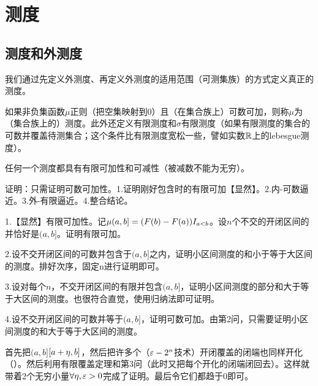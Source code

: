 \chapter{测度}

\section{测度和外测度}

我们通过先定义外测度、再定义外测度的适用范围（可测集族）的方式定义真正的测度。

如果非负集函数$\mu$正则（把空集映射到0）且（在集合族上）可数可加，则称$\mu$为（集合族上的）测度。此外还定义有限测度和$\sigma$有限测度（如果有限测度的集合的可数并覆盖待测集合；这个条件比有限测度宽松一些，譬如实数$\mbox{$\mathbb R$}$上的lebesgue测度）。

任何一个测度都具有有限可加性和可减性（被减数不能为无穷）。






证明：只需证明可数可加性。1.证明刚好包含时的有限可加【显然】。2.内-可数逼近。3.外-有限逼近。4.整合结论。

1.【显然】有限可加性。记$\mbox{$\mu$}(a,b]=(F(b)-F(a))I_{a<b}$。设$n$个不交的开闭区间的并恰好是$(a,b]$。证明有限可加。

2.设不交开闭区间的可数并包含于$(a,b]$之内，证明小区间测度的和小于等于大区间的测度。排好次序，固定n进行证明即可。

3.设对每个$n$，不交开闭区间的有限并包含$(a,b]$，证明小区间测度的部分和大于等于大区间的测度。也很符合直觉，使用归纳法即可证明。

4.设不交开闭区间的可数并等于$(a,b]$，证明可数可加。由第2问，只需要证明小区间测度的和大于等于大区间的测度。

首先把$(a,b]$$[a+\mbox{$\eta$},b]$，然后把许多个（$\mbox{$\varepsilon$}-2^n$技术）开闭覆盖的闭端也同样开化（）。然后利用有限覆盖定理和第3问（此时又把每个开化的闭端闭回去）。这样就带着2个无穷小量$\forall\mbox{$\eta$},\mbox{$\varepsilon$}>0$完成了证明。最后令它们都趋于0即可。

